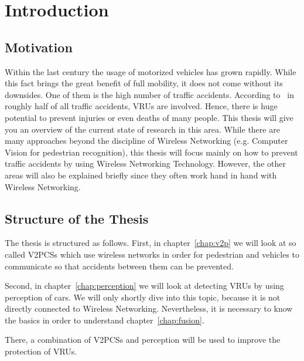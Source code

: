 \documentclass[]{ccs-thesis}
\begin{document}
\cleardoublepage
\tableofcontents

\cleardoublepage
{}


\chapter{Introduction}
\label{chap:introduction}


\section{Motivation}
\label{sec:motivation}

Within the last century the usage of motorized vehicles has grown rapidly. While this fact brings the great benefit of full mobility, it does not come without its downsides. One of them is the high number of traffic accidents. According to~\cite{v2pcomm} in roughly half of all traffic accidents, \acp{VRU} are involved. Hence, there is huge potential to prevent injuries or even deaths of many people. This thesis will give you an overview of the current state of research in this area. While there are many approaches beyond the discipline of Wireless Networking (e.g. Computer Vision for pedestrian recognition), this thesis will focus mainly on how to prevent traffic accidents by using Wireless Networking Technology. However, the other areas will also be explained briefly since they often work hand in hand with Wireless Networking.

\section{Structure of the Thesis}
\label{sec:structure}

The thesis is structured as follows. First, in chapter~\ref{chap:v2p} we will look at so called \acp{V2PCS} which use wireless networks in order for pedestrian and vehicles to communicate so that accidents between them can be prevented.

Second, in chapter~\ref{chap:perception} we will look at detecting \acp{VRU} by using perception of cars. We will only shortly dive into this topic, because it is not directly connected to Wireless Networking. Nevertheless, it is necessary to know the basics in order to understand chapter~\ref{chap:fusion}.

There, a combination of \acp{V2PCS} and perception will be used to improve the protection of \acp{VRU}.
\end{document}
